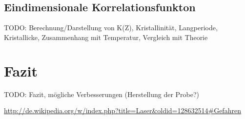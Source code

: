 \documentclass[bigchapter,colorback,accentcolor=tud4b,linedtoc,11pt]{tudreport}
\begin{document}
\section{Eindimensionale Korrelationsfunkton}
TODO: Berechnung/Darstellung von K(Z), Kristallinität, Langperiode, Kristallicke, Zusammenhang mit Temperatur, Vergleich mit Theorie

\chapter{Fazit}
TODO: Fazit, mögliche Verbesserungen (Herstellung der Probe?)

\cleardoublepage{}
\newpage
\begin{thebibliography}{100}
   \url{http://de.wikipedia.org/w/index.php?title=Laser&oldid=128632514#Gefahren}
\end{thebibliography}

\cleardoublepage{}
\end{document}
